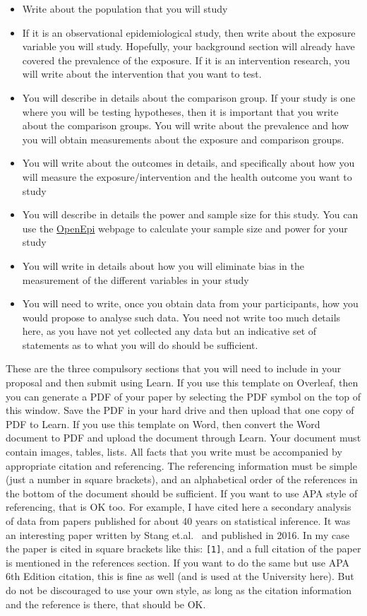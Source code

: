 \documentclass[a4paper]{article}
\begin{document}
\begin{itemize}
\item Write about the population that you will study
\item If it is an observational epidemiological study, then write about the exposure variable you will study. Hopefully, your background section will already have covered the prevalence of the exposure. If it is an intervention research, you will write about the intervention that you want to test.
\item You will describe in details about the comparison group. If your study is one where you will be testing hypotheses, then it is important that you write about the comparison groups. You will write about the prevalence and how you will obtain measurements about the exposure and comparison groups.
\item You will write about the outcomes in details, and specifically about how you will measure the exposure/intervention and the health outcome you want to study
\item You will describe in details the power and sample size for this study. You can use the \href{http://www.openepi.com/Menu/OE_Menu.htm}{OpenEpi} webpage to calculate your sample size and power for your study
\item You will write in details about how you will eliminate bias in the measurement of the different variables in your study
\item You will need to write, once you obtain data from your participants, how you would propose to analyse such data. You need not write too much details here, as you have not yet collected any data but an indicative set of statements as to what you will do should be sufficient. 
\end{itemize}

These are the three compulsory sections that you will need to include in your proposal and then submit using Learn. If you use this template on Overleaf, then you can generate a PDF of your paper by selecting the PDF symbol on the top of this window. Save the PDF in your hard drive and then upload that one copy of PDF to Learn. If you use this template on Word, then convert the Word document to PDF and upload the document through Learn. Your document must contain images, tables, lists. All facts that you write must be accompanied by appropriate citation and referencing. The referencing information must be simple (just a number in square brackets), and an alphabetical order of the references in the bottom of the document should be sufficient. If you want to use APA style of referencing, that is OK too. For example, I have cited here a secondary analysis of data from papers published for about 40 years on statistical inference. It was an interesting paper written by Stang et.al.~\cite{Stang:2016ca} and published in 2016. In my case the paper is cited in square brackets like this: \texttt{[1]}, and a full citation of the paper is mentioned in the references section. If you want to do the same but use APA 6th Edition citation, this is fine as well (and is used at the University here). But do not be discouraged to use your own style, as long as the citation information and the reference is there, that should be OK. 
\end{document}
